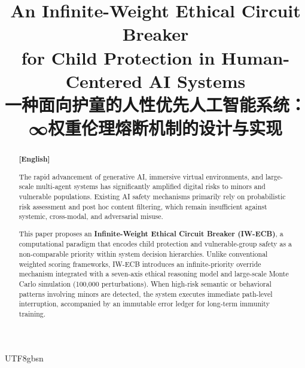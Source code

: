 \documentclass[conference]{IEEEtran}
\begin{document}
\begin{CJK}{UTF8}{gbsn}

\title{An Infinite-Weight Ethical Circuit Breaker \\
for Child Protection in Human-Centered AI Systems\\
\vspace{0.3cm}
{\large 一种面向护童的人性优先人工智能系统：\\
∞权重伦理熔断机制的设计与实现}}

\author{
\and
{}
}

\maketitle

\begin{abstract}
\textbf{[English]}

The rapid advancement of generative AI, immersive virtual environments, and large-scale multi-agent systems has significantly amplified digital risks to minors and vulnerable populations. Existing AI safety mechanisms primarily rely on probabilistic risk assessment and post hoc content filtering, which remain insufficient against systemic, cross-modal, and adversarial misuse.

This paper proposes an \textbf{Infinite-Weight Ethical Circuit Breaker (IW-ECB)}, a computational paradigm that encodes child protection and vulnerable-group safety as a non-comparable priority within system decision hierarchies. Unlike conventional weighted scoring frameworks, IW-ECB introduces an infinite-priority override mechanism integrated with a seven-axis ethical reasoning model and large-scale Monte Carlo simulation (100,000 perturbations). When high-risk semantic or behavioral patterns involving minors are detected, the system executes immediate path-level interruption, accompanied by an immutable error ledger for long-term immunity training.


\end{abstract}
\end{CJK}
\end{document}
